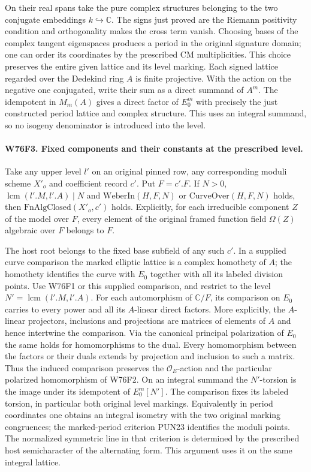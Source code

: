 On their real spans take the pure complex structures belonging
to the two conjugate embeddings $k\hookrightarrow\mathbb C$.
The signs just proved are the Riemann positivity condition and
orthogonality makes the cross term vanish. Choosing bases of the
complex tangent eigenspaces produces a period in the original
signature domain; one can order its coordinates by the prescribed
CM multiplicities. This choice preserves the entire given lattice
and its level marking. Each signed lattice regarded over the
Dedekind ring $A$ is finite projective. With the action on the
negative one conjugated, write their sum as a direct summand
of $A^m$. The idempotent in $M_m(A)$ gives a direct factor
of $E_0^m$ with precisely the just constructed period lattice
and complex structure. This uses an integral summand, so no
isogeny denominator is introduced into the level.

\paragraph{W76F3. Fixed components and their constants at the prescribed level.}
Take any upper level $l'$ on an original pinned row, any
corresponding moduli scheme $X'_o$ and coefficient record $c'$.
Put $F=c'.F$. If $N>0$, $\operatorname{lcm}(l'.M,l'.A)\mid N$
and $\mathrm{WeberIn}(H,F,N)$ or $\mathrm{CurveOver}(H,F,N)$
holds, then $\mathrm{FnAlgClosed}(X'_o,c')$ holds. Explicitly,
for each irreducible component $Z$ of the model over $F$,
every element of the original framed function field $\Omega(Z)$
algebraic over $F$ belongs to $F$.

The host root belongs to the fixed base subfield of any such
$c'$. In a supplied curve comparison the marked elliptic lattice
is a complex homothety of $A$; the homothety identifies the
curve with $E_0$ together with all its labeled division points.
Use W76F1 or this supplied comparison, and restrict
to the level $N'=\operatorname{lcm}(l'.M,l'.A)$. For each
automorphism of $\mathbb C/F$, its comparison on $E_0$ carries
to every power and all its $A$-linear direct factors. More
explicitly, the $A$-linear projectors, inclusions and projections
are matrices of elements of $A$ and hence intertwine the
comparison. Via the canonical principal polarization of $E_0$
the same holds for homomorphisms to the dual. Every homomorphism
between the factors or their duals extends by projection and
inclusion to such a matrix. Thus the induced comparison preserves
the $\mathcal O_E$-action and the particular polarized homomorphism
of W76F2. On an integral summand the $N'$-torsion is the image
under its idempotent of $E_0^m[N']$. The comparison fixes its
labeled torsion, in particular both original level markings.
Equivalently in period coordinates one obtains an integral
isometry with the two original marking congruences; the
marked-period criterion PUN23 identifies the moduli points.
The normalized symmetric line in that criterion is determined by
the prescribed host semicharacter of the alternating form. This
argument uses it on the same integral lattice.

